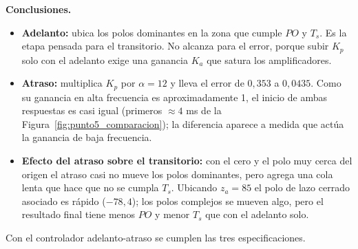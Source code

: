 \documentclass[11pt,a4paper]{article}
\begin{document}
\textbf{Conclusiones.}
\begin{itemize}
    \item \textbf{Adelanto:} ubica los polos dominantes en la zona que cumple $PO$ y $T_s$. Es la etapa pensada para el transitorio. No alcanza para el error, porque subir $K_p$ solo con el adelanto exige una ganancia $K_a$ que satura los amplificadores.
    \item \textbf{Atraso:} multiplica $K_p$ por $\alpha = 12$ y lleva el error de $0{,}353$ a $0{,}0435$. Como su ganancia en alta frecuencia es aproximadamente 1, el inicio de ambas respuestas es casi igual (primeros $\approx 4$ ms de la Figura~\ref{fig:punto5_comparacion}); la diferencia aparece a medida que actúa la ganancia de baja frecuencia.
    \item \textbf{Efecto del atraso sobre el transitorio:} con el cero y el polo muy cerca del origen el atraso casi no mueve los polos dominantes, pero agrega una cola lenta que hace que no se cumpla $T_s$. Ubicando $z_a = 85$ el polo de lazo cerrado asociado es rápido ($-78{,}4$); los polos complejos se mueven algo, pero el resultado final tiene menos $PO$ y menor $T_s$ que con el adelanto solo.
\end{itemize}
Con el controlador adelanto-atraso se cumplen las tres especificaciones.
\end{document}
